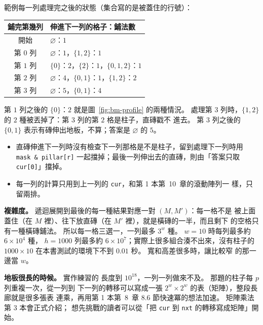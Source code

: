 
範例每一列處理完之後的狀態（集合寫的是被蓋住的行號）：

\begin{center}
\begin{tabular}{cl}
\toprule
鋪完第幾列 & 伸進下一列的格子：鋪法數 \\
\midrule
開始 & $\varnothing$：$1$ \\
第 $0$ 列 & $\varnothing$：$1$，\quad $\{1, 2\}$：$1$ \\
第 $1$ 列 & $\{0\}$：$2$，\quad $\{2\}$：$1$，\quad $\{0, 1, 2\}$：$1$ \\
第 $2$ 列 & $\varnothing$：$4$，\quad $\{0, 1\}$：$1$，\quad $\{1, 2\}$：$2$ \\
第 $3$ 列 & $\varnothing$：$5$，\quad $\{0, 1\}$：$4$ \\
\bottomrule
\end{tabular}
\end{center}

第 $1$ 列之後的 $\{0\}$：$2$ 就是圖~\ref{fig:bm-profile} 的兩種情況。 處理第
$3$ 列時，$\{1, 2\}$ 的 $2$ 種被丟掉了：第 $3$ 列的第 $2$ 格是柱子，直磚戳不
進去。 第 $3$ 列之後的 $\{0, 1\}$ 表示有磚伸出地板，不算；答案是
$\varnothing$ 的 $5$。

\begin{itemize}
\item 直磚伸進下一列時沒有檢查下一列那格是不是柱子，留到處理下一列時用
\texttt{mask \& pillar[r]} 一起擋掉；最後一列伸出去的直磚，則由「答案只取
\texttt{cur[0]}」擋掉。
\item 每一列的計算只用到上一列的 \texttt{cur}，和第 1 本第~10~章的滾動陣列一
樣，只留兩排。
\end{itemize}

\textbf{複雜度。} 遞迴展開到最後的每一種結果對應一對 $(M, M')$：每一格不是
被上面蓋住（在 $M$ 裡）、往下放直磚（在 $M'$ 裡），就是橫磚的一半，而且剩下
的空格只有一種橫磚鋪法。 所以每一格三選一，一列最多 $3^w$ 種。 $w = 10$ 時每列最多約 $6 \times 10^4$ 種，
$h = 1000$ 列最多約 $6 \times 10^7$；實際上很多組合湊不出來，沒有柱子的
$1000 \times 10$ 在本書測試的環境下不到 $0.01$ 秒。 寬和高差很多時，讓比較窄
的那一邊當 $w$。

\textbf{地板很長的時候。} 實作練習的
長度到 $10^{18}$，一列一列做來不及。 那題的柱子每 $p$ 列重複一次，從一列到
下一列的轉移可以寫成一張 $2^w \times 2^w$ 的表（矩陣），整段長廊就是很多張表
連乘，再用第 1 本第~8~章 8.6 節快速冪的想法加速。 矩陣乘法第 3 本會正式介紹；
想先挑戰的讀者可以從「把 \texttt{cur} 到 \texttt{nxt} 的轉移寫成矩陣」開始。

